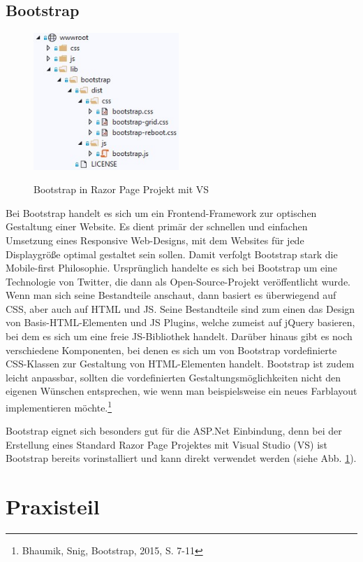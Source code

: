 \documentclass[a4paper,
12pt,
oneside]
{article}
\newcommand{\sPar}{\par\vspace*{6pt}}
\begin{document}
	\subsection{Bootstrap}
	 \begin{figure}
	 	\centering
	 	\caption{Bootstrap in Razor Page Projekt mit VS} 
	 	\includegraphics[width=5.5cm]{img/bootstrap_asp.jpg} \\
	 	\label{fig:bootstrap_asp}
	 \end{figure}
	Bei Bootstrap handelt es sich um ein Frontend-Framework zur optischen Gestaltung einer Website. Es dient primär der schnellen und einfachen Umsetzung eines Responsive Web-Designs, mit dem Websites für jede Displaygröße optimal gestaltet sein sollen. Damit verfolgt Bootstrap stark die Mobile-first Philosophie. Ursprünglich handelte es sich bei Bootstrap um eine Technologie von Twitter, die dann als Open-Source-Projekt veröffentlicht wurde. Wenn man sich seine Bestandteile anschaut, dann basiert es überwiegend auf CSS, aber auch auf HTML und JS. Seine Bestandteile sind zum einen das Design von Basis-HTML-Elementen und JS Plugins, welche zumeist auf jQuery basieren, bei dem es sich um eine freie JS-Bibliothek handelt. 
	Darüber hinaus gibt es noch verschiedene Komponenten, bei denen es sich um von Bootstrap vordefinierte CSS-Klassen zur Gestaltung von HTML-Elementen handelt. Bootstrap ist zudem leicht anpassbar, sollten die vordefinierten Gestaltungsmöglichkeiten nicht den eigenen Wünschen entsprechen, wie wenn man beispielsweise ein neues Farblayout implementieren möchte.\footnote{Bhaumik, Snig, Bootstrap, 2015, S. 7-11} \sPar
	Bootstrap eignet sich besonders gut für die ASP.Net Einbindung, denn bei der Erstellung eines Standard Razor Page Projektes mit Visual Studio (VS) ist Bootstrap bereits vorinstalliert und kann direkt verwendet werden (siehe Abb. \ref{fig:bootstrap_asp}).
	\clearpage
	
	
	
	
	
	\section{Praxisteil}
	
\end{document}
